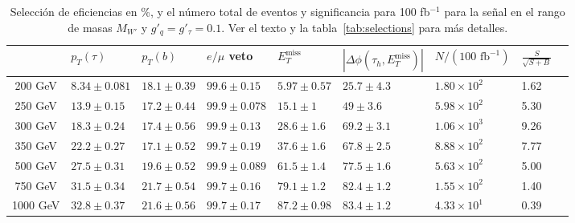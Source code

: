 \begin{table}[htbp]
\resizebox{17.3cm}{!} {
\begin{tabular}{cllllllll}\hline
{} &               $p_T(\tau)$ &             $p_T(b)$ & $e/\mu$ veto & $E_T^{\text{miss}}$ &      $|\Delta \phi (\tau_h,E_T^{\text{miss}})|$& $N/(\text{100 fb}^{-1})$& $\frac{S}{\sqrt{S+B}}$ \\\hline
200 GeV  &   $8.34 \pm 0.081$ &    $18.1 \pm 0.39$ &   $99.6 \pm 0.15$ &   $5.97 \pm 0.57$ &   $25.7 \pm 4.3$&$1.80\times 10^{2}$& 1.62 \\
250 GeV  &      $13.9 \pm 0.15$ &     $17.2 \pm 0.44$ &  $99.9 \pm 0.078$ &   $15.1 \pm 1$ &     $49 \pm 3.6$ &$5.98\times 10^{2}$&5.30\\
300 GeV  &    $18.3 \pm 0.24$ &     $17.4 \pm 0.56$ &   $99.9 \pm 0.13$ &   $28.6 \pm 1.6$ &   $69.2 \pm 3.1$& $1.06\times 10^{3}$&9.26\\
350 GeV  &    $22.2 \pm 0.27$ &     $17.1 \pm 0.52$ &   $99.7 \pm 0.19$ &   $37.6 \pm 1.6$ &   $67.8 \pm 2.5$&$8.88\times 10^{2}$&7.77 \\
500 GeV  &    $27.5 \pm 0.31$ &     $19.6 \pm 0.52$ &  $99.9 \pm 0.089$ &   $61.5 \pm 1.4$ &   $77.5 \pm 1.6$&$5.63\times 10^{2}$&5.00 \\
750 GeV  &    $31.5 \pm 0.34$ &     $21.7 \pm 0.54$ &   $99.7 \pm 0.16$ &   $79.1 \pm 1.2$ &   $82.4 \pm 1.2$&$1.55\times 10^{2}$&1.40 \\
1000 GeV &   $32.8 \pm 0.37$ &     $21.6 \pm 0.56$ &   $99.7 \pm 0.17$ &   $87.2 \pm 0.98$ &   $83.4 \pm 1.2$&$4.33\times 10^{1}$&0.39 \\\hline
\end{tabular} }
\caption {Selección de eficiencias en \%, y el número total de eventos y significancia para 100 fb$^{-1}$ para la señal en el rango de masas $M_{W'}$ y $g'_q=g'_\tau=0.1$. Ver el texto y la tabla~\ref{tab:selections} para más detalles.}
\label{tab:cutefficiencynw}
\end{table}
%
